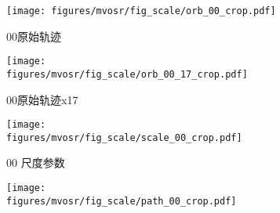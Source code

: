 \begin{figure}
    \centering
    \begin{subfigure}[b]{0.23\textwidth}
    \texttt{[image: figures/mvosr/fig\_scale/orb\_00\_crop.pdf]}

    \caption{00原始轨迹}
    \vspace*{2mm}

    \label{fig:orb_path_00}
    \end{subfigure}
    \begin{subfigure}[b]{0.23\textwidth}
        \texttt{[image: figures/mvosr/fig\_scale/orb\_00\_17\_crop.pdf]}

        \caption{00原始轨迹x17}
        \label{fig:orb_path_00_17}
        \vspace*{2mm}
        \end{subfigure}
        \begin{subfigure}[b]{0.23\textwidth}
            \texttt{[image: figures/mvosr/fig\_scale/scale\_00\_crop.pdf]}

            \caption{00 尺度参数}
            \label{fig:scale_00}
            \vspace*{2mm}
            \end{subfigure}
            \begin{subfigure}[b]{0.23\textwidth}
                \texttt{[image: figures/mvosr/fig\_scale/path\_00\_crop.pdf]}


\end{subfigure}
\end{figure}
